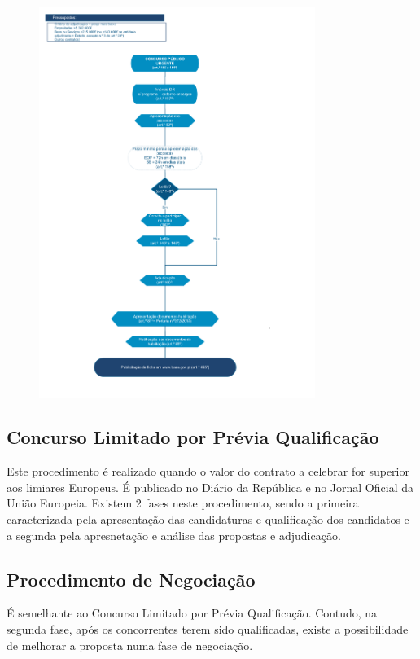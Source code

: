 \documentclass{book}
\begin{document}
	\begin{figure}[H]
		\centering
		\includegraphics[width=0.8\textwidth]{cp_urgente_ccp.png}
		\caption{}
		\label{}
	\end{figure}
	
	
	\newpage
	\subsection*{Concurso Limitado por Prévia Qualificação}

	Este procedimento é realizado quando o valor do contrato a celebrar for superior aos limiares Europeus. É publicado no Diário da República e no Jornal Oficial da União Europeia. Existem 2 fases neste procedimento, sendo a primeira caracterizada pela apresentação das candidaturas e qualificação dos candidatos e a segunda pela apresnetação e análise das propostas e adjudicação. \\
	
	
	\subsection*{Procedimento de Negociação}
	É semelhante ao Concurso Limitado por Prévia Qualificação. Contudo, na segunda fase, após os concorrentes terem sido qualificadas, existe a possibilidade de melhorar a proposta numa fase de negociação. \\
	
\end{document}
